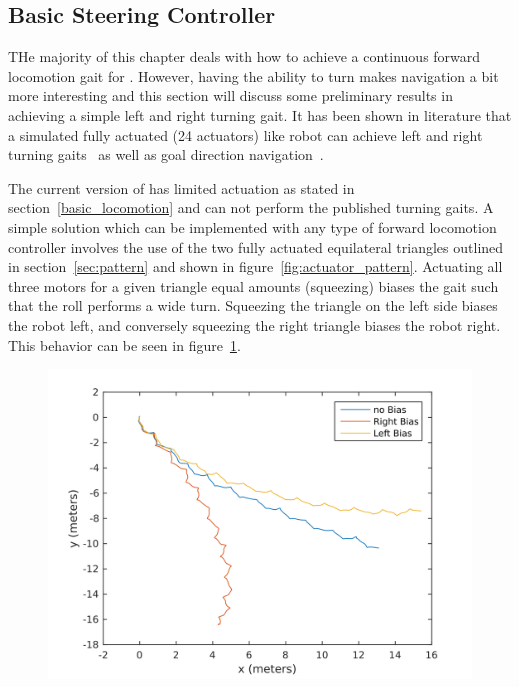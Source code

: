 \subsection{Basic Steering Controller}
\label{sec:steering}
THe majority of this chapter deals with how to achieve a continuous forward locomotion gait for \SB{}.
However, having the ability to turn makes navigation a bit more interesting and this section will discuss some preliminary results in achieving a simple left and right turning gait.
It has been shown in literature that a simulated fully actuated (24 actuators) \SB{} like robot can achieve left and right turning gaits~\cite{kim2014rapid} as well as goal direction navigation~\cite{iscen2014flop}.

The current version of \SB{} has limited actuation as stated in section~\ref{basic_locomotion} and can not perform the published turning gaits.
A simple solution which can be implemented with any type of forward locomotion controller involves the use of the two fully actuated equilateral triangles outlined in section~\ref{sec:pattern} and shown in figure~\ref{fig:actuator_pattern}.
Actuating all three motors for a given triangle equal amounts (squeezing) biases the gait such that the roll performs a wide turn.
Squeezing the triangle on the left side biases the robot left, and conversely squeezing the right triangle biases the robot right.
This behavior can be seen in figure~\ref{fig:turning}.

\begin{figure}[thbp]
    \centering
    \includegraphics[width=0.8\linewidth]{tex/img/left_right_paths}
    \caption{}
    \label{fig:turning}
\end{figure}

